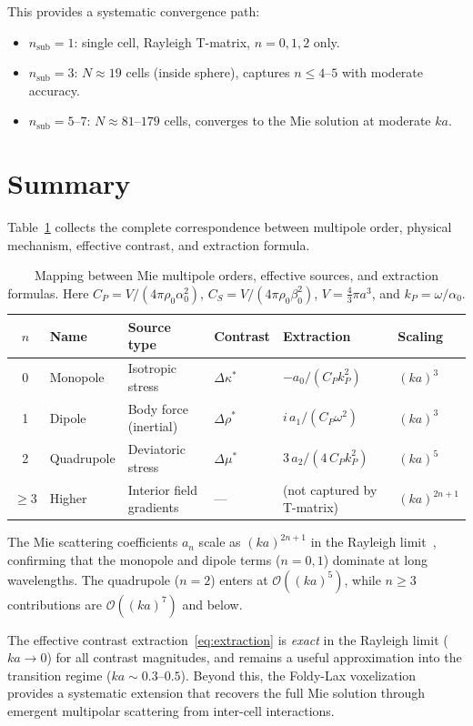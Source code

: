 \documentclass[11pt,a4paper]{article}
\newcommand{\order}[1]{\mathcal{O}\!\left(#1\right)}
\newcommand{\Dmu}{\Delta\mu}
\newcommand{\Drho}{\Delta\rho}
\newcommand{\Dkappa}{\Delta\kappa}
\begin{document}
This provides a systematic convergence path:
\begin{itemize}
  \item $n_\text{sub} = 1$: single cell, Rayleigh T-matrix,
    $n = 0, 1, 2$ only.
  \item $n_\text{sub} = 3$: $N \approx 19$ cells (inside sphere),
    captures $n \leq 4$--$5$ with moderate accuracy.
  \item $n_\text{sub} = 5$--$7$: $N \approx 81$--$179$ cells,
    converges to the Mie solution at moderate $ka$.
\end{itemize}

\section{Summary}
\label{sec:summary}

Table~\ref{tab:summary} collects the complete correspondence between
multipole order, physical mechanism, effective contrast, and extraction
formula.

\begin{table}[ht]
\centering
\caption{Mapping between Mie multipole orders, effective sources,
  and extraction formulas.  Here
  $C_P = V/(4\pi\rho_0\alpha_0^2)$,
  $C_S = V/(4\pi\rho_0\beta_0^2)$,
  $V = \tfrac{4}{3}\pi a^3$, and $k_P = \omega/\alpha_0$.}
\label{tab:summary}
\begin{tabular}{@{}clllll@{}}
\toprule
$n$ & Name & Source type & Contrast & Extraction & Scaling \\
\midrule
0 & Monopole & Isotropic stress
  & $\Dkappa^*$ & $-a_0/(C_P k_P^2)$
  & $(ka)^3$ \\[4pt]
1 & Dipole & Body force (inertial)
  & $\Drho^*$ & $i\,a_1/(C_P \omega^2)$
  & $(ka)^3$ \\[4pt]
2 & Quadrupole & Deviatoric stress
  & $\Dmu^*$ & $3\,a_2/(4\,C_P k_P^2)$
  & $(ka)^5$ \\[4pt]
$\geq 3$ & Higher & Interior field gradients
  & --- & (not captured by T-matrix)
  & $(ka)^{2n+1}$ \\
\bottomrule
\end{tabular}
\end{table}

The Mie scattering coefficients $a_n$ scale as $(ka)^{2n+1}$ in the
Rayleigh limit~\cite{YingTruell1956}, confirming that the monopole
and dipole terms ($n = 0, 1$) dominate at long wavelengths.  The
quadrupole ($n = 2$) enters at $\order{(ka)^5}$, while $n \geq 3$
contributions are $\order{(ka)^7}$ and below.

The effective contrast extraction~\eqref{eq:extraction} is
\emph{exact} in the Rayleigh limit ($ka \to 0$) for all contrast
magnitudes, and remains a useful approximation into the transition
regime ($ka \sim 0.3$--$0.5$).  Beyond this, the Foldy-Lax
voxelization provides a systematic extension that recovers the full
Mie solution through emergent multipolar scattering from inter-cell
interactions.



\end{document}
